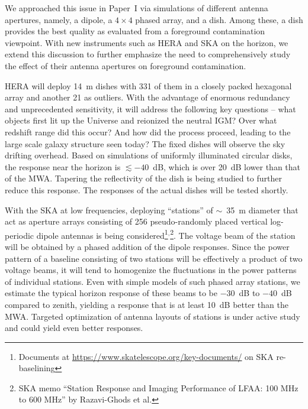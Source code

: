 \documentclass[preprint2,apjl,numberedappendix,twocolappendix,appendixfloats]{emulateapj}
\begin{document}
We approached this issue in Paper~I via simulations of different antenna apertures, namely, a dipole, a $4\times 4$ phased array, and a dish. Among these, a dish provides the best quality as evaluated from a foreground contamination viewpoint. With new instruments such as HERA and SKA on the horizon, we extend this discussion to further emphasize the need to comprehensively study the effect of their antenna apertures on foreground contamination. 



HERA will deploy 14~m dishes with 331 of them in a closely packed hexagonal array and another 21 as outliers. With the advantage of enormous redundancy and unprecedented sensitivity, it will address the following key questions -- what objects first lit up the Universe and reionized the neutral IGM? Over what redshift range did this occur? And how did the process proceed, leading to the large scale galaxy structure seen today? The fixed dishes will observe the sky drifting overhead. Based on simulations of uniformly illuminated circular disks, the response near the horizon is $\lesssim -40$~dB, which is over 20~dB lower than that of the MWA. Tapering the reflectivity of the dish is being studied to further reduce this response. The responses of the actual dishes will be tested shortly. 

With the SKA at low frequencies, deploying ``stations'' of $\sim$~35~m diameter that act as aperture arrays consisting of 256 pseudo-randomly placed vertical log-periodic dipole antennas is being considered\footnote{Documents at \url{https://www.skatelescope.org/key-documents/} on SKA re-baselining}$^,$\footnote{SKA memo ``Station Response and Imaging Performance of LFAA: 100 MHz to 600 MHz'' by Razavi-Ghods et al.}. The voltage beam of the station will be obtained by a phased addition of the dipole responses. Since the power pattern of a baseline consisting of two stations will be effectively a product of two voltage beams, it will tend to homogenize the fluctuations in the power patterns of individual stations. Even with simple models of such phased array stations, we estimate the typical horizon response of these beams to be $-30$~dB to $-40$~dB compared to zenith, yielding a response that is at least 10~dB better than the MWA. Targeted optimization of antenna layouts of stations is under active study and could yield even better responses. 
\end{document}
